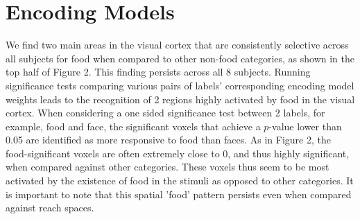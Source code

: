 \documentclass[../thesis.tex]{subfiles}
\begin{document}
\section{Encoding Models}

 We find two main areas in the visual cortex that are consistently selective across all subjects for food when compared to other non-food categories, as shown in the top half of Figure 2. This finding persists across all 8 subjects. Running significance tests comparing various pairs of labels' corresponding encoding model weights leads to the recognition of 2 regions highly activated by food in the visual cortex. When considering a one sided significance test between 2 labels, for example, food and face, the significant voxels that achieve a $p$-value lower than 0.05 are identified as more responsive to food than faces. As in Figure 2, the food-significant voxels are often extremely close to 0, and thus highly significant, when compared against other categories. These voxels thus seem to be most activated by the existence of food in the stimuli as opposed to other categories. It is important to note that this spatial 'food' pattern persists even when compared against reach spaces.\\
\end{document}
